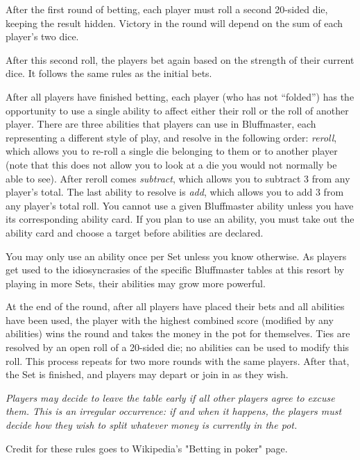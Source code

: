 \documentclass[green]{Kos}
\begin{document}
After the first round of betting, each player must roll a second 20-sided die, keeping the result hidden. Victory in the round will depend on the sum of each player’s two dice.

After this second roll, the players bet again based on the strength of their current dice. It follows the same rules as the initial bets.

After all players have finished betting, each player (who has not “folded”) has the opportunity to use a single ability to affect either their roll or the roll of another player. There are three abilities that players can use in Bluffmaster, each representing a different style of play, and resolve in the following order: \emph{reroll}, which allows you to re-roll a single die belonging to them or to another player (note that this does not allow you to look at a die you would not normally be able to see). After reroll comes \emph{subtract}, which allows you to subtract 3 from any player’s total. The last ability to resolve is \emph{add}, which allows you to add 3 from any player’s total roll. You cannot use a given Bluffmaster ability unless you have its corresponding ability card. If you plan to use an ability, you must take out the ability card and choose a target before abilities are declared. 

You may only use an ability once per Set unless you know otherwise. As players get used to the idiosyncrasies of the specific Bluffmaster tables at this resort by playing in more Sets, their abilities may grow more powerful. 

At the end of the round, after all players have placed their bets and all abilities have been used, the player with the highest combined score (modified by any abilities) wins the round and takes the money in the pot for themselves. Ties are resolved by an open roll of a 20-sided die; no abilities can be used to modify this roll. This process repeats for two more rounds with the same players. After that, the Set is finished, and players may depart or join in as they wish.

\emph{Players may decide to leave the table early if all other players agree to excuse them. This is an irregular occurrence: if and when it happens, the players must decide how they wish to split whatever money is currently in the pot.}

\begin{itemz}[Notes]
\item Credit for these rules goes to Wikipedia's "Betting in poker" page.
\end{itemz}
\end{document}
